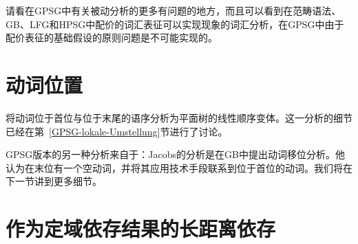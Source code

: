 请看\citet[--396]{Jacobson87b}在GPSG中有关被动分析的更多有问题的地方，而且可以看到在范畴语法、GB、LFG和HPSG中配价的词汇表征可以实现现象的词汇分析，在GPSG中由于配价表征的基础假设的原则问题是不可能实现的。

\section{动词位置}
\label{Abschnitt-Verbstellung-GPSG}

\mbox{}\citet{Uszkoreit87a} 将动词位于首位与位于末尾的语序分析为平面树的线性顺序变体。这一分析的细节已经在第~\ref{GPSG-lokale-Umstellung}节进行了讨论。

GPSG版本的另一种分析来自于\citet[]{Jacobs86a}：Jacobs的分析是在GB中提出动词移位分析。他认为在末位有一个空动词，并将其应用技术手段联系到位于首位的动词。我们将在下一节讲到更多细节。

\section{作为定域依存结果的长距离依存}
\label{Abschnitt-GPSG-Fernabhaengigkeiten}\label{sec-nld-gpsg}

